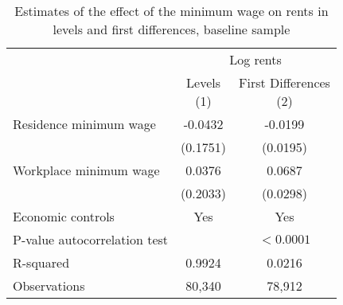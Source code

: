 \begin{table}[hbt!] \centering
    \caption{Estimates of the effect of the minimum wage on rents in levels and first differences,
             baseline sample}
    \label{tab:autocorrelation}
    \begin{tabular}{@{}lcc@{}}
        \toprule
            & \multicolumn{2}{c}{Log rents}                    \\ \cmidrule(l){2-3}
            & \shortstack{Levels\\(1)} 
            & \shortstack{First Differences\\(2)}                       \\ \midrule
        Residence minimum wage                      &  -0.0432   &  -0.0199              \\
                                                    & (0.1751)  & (0.0195)             \\
        Workplace minimum wage                      &  0.0376   &  0.0687              \\
                                                    & (0.2033)  & (0.0298)             \\ \midrule
        Economic controls                           &  Yes   &  Yes              \\
        P-value autocorrelation test                &        &  $<0.0001$        \\
        R-squared                                   &  0.9924   &  0.0216              \\
        Observations                                &  80,340  &  78,912             \\ \bottomrule
    \end{tabular}


\end{table}
